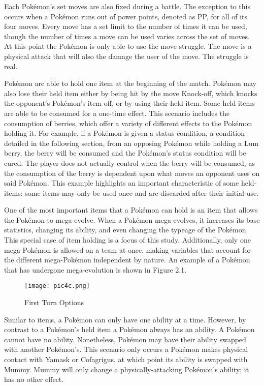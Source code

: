 \documentclass[12pt,twoside]{reedthesis}
\begin{document}
  Each Pokémon's set moves are also fixed during a battle. The exception
  to this occurs when a Pokémon runs out of power points, denoted as PP,
  for all of its four moves. Every move has a set limit to the number of
  times it can be used, though the number of times a move can be used
  varies across the set of moves. At this point the Pokémon is only able
  to use the move struggle. The move is a physical attack that will also
  the damage the user of the move. The struggle is real.
  
  Pokémon are able to hold one item at the beginning of the match. Pokémon
  may also lose their held item either by being hit by the move Knock-off,
  which knocks the opponent's Pokémon's item off, or by using their held
  item. Some held items are able to be consumed for a one-time effect.
  This scenario includes the consumption of berries, which offer a variety
  of different effects to the Pokémon holding it. For example, if a
  Pokémon is given a status condition, a condition detailed in the
  following section, from an opposing Pokémon while holding a Lum berry,
  the berry will be consumed and the Pokémon's status condition will be
  cured. The player does not actually control when the berry will be
  consumed, as the consumption of the berry is dependent upon what moves
  an opponent uses on said Pokémon. This example highlights an important
  characteristic of some held-items: some items may only be used once and
  are discarded after their initial use.
  
  One of the most important items that a Pokémon can hold is an item that
  allows the Pokémon to mega-evolve. When a Pokémon mega-evolves, it
  increases its base statistics, changing its ability, and even changing
  the typeage of the Pokémon. This special case of item holding is a focus
  of this study. Additionally, only one mega-Pokémon is allowed on a team
  at once, making variables that account for the different mega-Pokémon
  independent by nature. An example of a Pokémon that has undergone
  mega-evolution is shown in Figure 2.1.
  
  \begin{figure}[htbp]
  \centering
  \texttt{[image: pic4c.png]}
  \caption{First Turn Options}
  \end{figure}
  
  Similar to items, a Pokémon can only have one ability at a time.
  However, by contrast to a Pokémon's held item a Pokémon always has an
  ability. A Pokémon cannot have no ability. Nonetheless, Pokémon may have
  their ability swapped with another Pokémon's. This scenario only occurs
  a Pokémon makes physical contact with Yamask or Cofagrigus, at which
  point its ability is swapped with Mummy. Mummy will only change a
  physically-attacking Pokémon's ability; it has no other effect.
  
\end{document}
